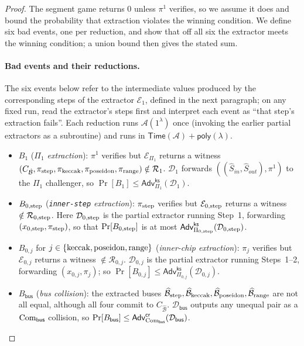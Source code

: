 \begin{proof}
The segment game returns $0$ unless $\pi^1$ verifies, so we assume it does and
bound the probability that extraction violates the winning condition. We define
six bad events, one per reduction, and show that off all six the extractor meets
the winning condition; a union bound then gives the stated sum.

\paragraph{Bad events and their reductions.}
The six events below refer to the intermediate values produced by the
corresponding steps of the extractor $\mathcal{E}_1$, defined in the next
paragraph; on any fixed run, read the extractor's steps first and interpret
each event as ``that step's extraction fails''.
Each reduction runs $\mathcal{A}(1^\lambda)$ once (invoking the earlier partial
extractors as a subroutine) and runs in
$\mathsf{Time}(\mathcal{A})+\mathsf{poly}(\lambda)$.
\begin{itemize}
  \item $B_1$ (\emph{$\Pi_1$ extraction}): $\pi^1$ verifies but
    $\mathcal{E}_{\Pi_1}$ returns a witness
    $(C_{\hat{\mathcal{B}}},\pi_{\mathrm{step}},\pi_{\mathrm{keccak}},\pi_{\mathrm{poseidon}},\pi_{\mathrm{range}})\notin\mathcal{R}_1$.
    $\mathcal{D}_1$ forwards $((\hat{S}_{in},\hat{S}_{out}),\pi^1)$ to the $\Pi_1$
    challenger, so
    $\Pr[B_1]\le\mathsf{Adv}^{\mathsf{ks}}_{\Pi_1}(\mathcal{D}_1)$.
  \item $B_{0,\mathrm{step}}$ (\emph{\texttt{inner-step} extraction}): $\pi_{\mathrm{step}}$
    verifies but $\mathcal{E}_{0,\mathrm{step}}$ returns a witness
    $\notin\mathcal{R}_{0,\mathrm{step}}$. Here $\mathcal{D}_{0,\mathrm{step}}$ is the partial
    extractor running Step~1, forwarding $(x_{0,\mathrm{step}},\pi_{\mathrm{step}})$, so that
    $\Pr[B_{0,\mathrm{step}}]$ is at most
    $\mathsf{Adv}^{\mathsf{ks}}_{\Pi_{0,\mathrm{step}}}(\mathcal{D}_{0,\mathrm{step}})$.
  \item $B_{0,j}$ for $j\in\{\mathrm{keccak},\mathrm{poseidon},\mathrm{range}\}$ (\emph{inner-chip
    extraction}): $\pi_j$ verifies but $\mathcal{E}_{0,j}$ returns a witness
    $\notin\mathcal{R}_{0,j}$. $\mathcal{D}_{0,j}$ is the partial extractor
    running Steps~1--2, forwarding $(x_{0,j},\pi_j)$; so
    $\Pr[B_{0,j}]\le\mathsf{Adv}^{\mathsf{ks}}_{\Pi_{0,j}}(\mathcal{D}_{0,j})$.
  \item $B_{\mathsf{bus}}$ (\emph{bus collision}): the extracted buses
    $\widehat{\mathcal{B}}_{\mathrm{step}},\widehat{\mathcal{B}}_{\mathrm{keccak}},\widehat{\mathcal{B}}_{\mathrm{poseidon}},\widehat{\mathcal{B}}_{\mathrm{range}}$
    are not all equal, although all four commit to $C_{\hat{\mathcal{B}}}$.
    $\mathcal{D}_{\mathsf{bus}}$ outputs any unequal pair as a
    $\mathrm{Com}_{\mathsf{bus}}$ collision, so
    $\Pr[B_{\mathsf{bus}}]\le\mathsf{Adv}^{\mathsf{cr}}_{\mathrm{Com}_{\mathsf{bus}}}(\mathcal{D}_{\mathsf{bus}})$.
\end{itemize}


\end{proof}
